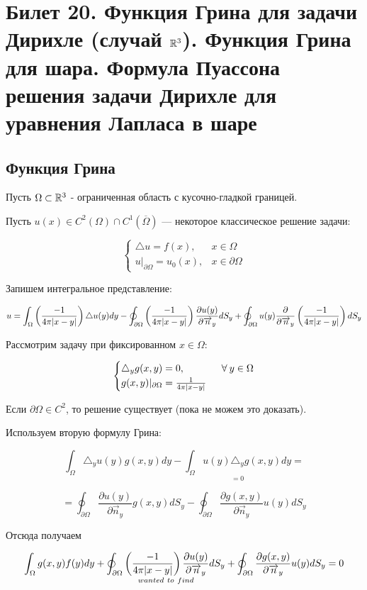 \section{Билет 20. Функция Грина для задачи Дирихле (случай $\mathbb{R}^3$). Функция Грина для шара. Формула Пуассона решения задачи Дирихле для уравнения Лапласа в шаре}

\subsection{Функция Грина}
Пусть $\Omega \subset \mathbb{R}^3$ - ограниченная область с кусочно-гладкой границей.

Пусть $u(x) \in C^2(\Omega) \cap C^1(\overline{\Omega})$ --- некоторое классическое решение задачи:

\[\begin{cases}
   \triangle u = f(x), & x\in \Omega \\
   u|_{\partial \Omega} = u_0(x), & x \in \partial \Omega  
\end{cases}\]  

Запишем интегральное представление:

$$ u = \int_{\Omega}{\left(\frac{-1}{4 \pi |x-y|}\right)  {\triangle u(y)} dy} - \oint_{\partial \Omega}{\left(\frac{-1}{4 \pi |x-y|}\right) \frac{\partial u(y)}{\partial \overrightarrow{n}_y} d S_y} + 
\oint_{\partial \Omega}{ {u(y)} \frac{\partial}{\partial \overrightarrow{n}_y}\left(\frac{-1}{4 \pi |x-y|}\right)d S_y}
$$

Рассмотрим задачу при фиксированном $x \in \Omega$:

\[\begin{cases}
   \triangle_y g(x,y) = 0, & \;\;\forall\: y \in \Omega \\
   g(x,y)|_{\partial \Omega} = \frac{1}{4 \pi |x-y|}  
\end{cases}\] 

Если $\partial \Omega \in C^2$, то решение существует (пока не можем это доказать).

Используем вторую формулу Грина:

$$ \int_{\Omega}{\triangle_y u(y) g(x,y)dy} - 
{\underset{=0}{\int_{\Omega}{u(y) \triangle_y g(x,y) dy}}}=$$

$$=\oint_{\partial \Omega} {\frac{\partial u(y)}{\partial \overrightarrow{n}_y} g(x,y) dS_y} - \oint_{\partial \Omega} {\frac{\partial g(x,y)}{\partial \overrightarrow{n}_y} u(y) dS_y} $$

Отсюда получаем

$$\int_{\Omega}{g(x,y) f(y) dy} + \underset{wanted~to~find}{\oint_{\partial \Omega}{\left(\frac{-1}{4 \pi |x-y|}\right) \frac{\partial u(y)}{\partial \overrightarrow{n}_y} d S_y}}+ \oint_{\partial \Omega}
{\frac{\partial g(x,y)}{\partial \overrightarrow{n}_y}u(y) dS_y} = 0
$$

